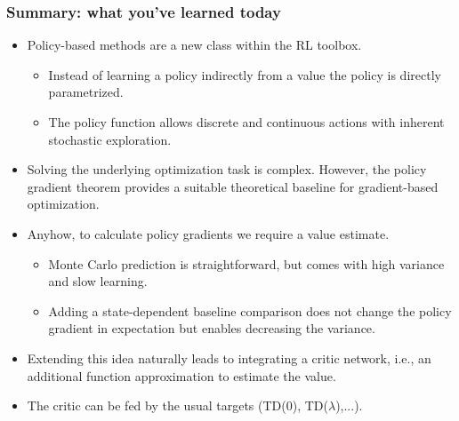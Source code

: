 \begin{frame}
	\frametitle{Summary: what you've learned today}
	\begin{itemize}
		\item Policy-based methods are a new class within the RL toolbox.
		      \begin{itemize}
			      \item Instead of learning a policy indirectly from a value the policy is directly parametrized.\pause
			      \item The policy function allows discrete and continuous actions with inherent stochastic exploration.\pause
		      \end{itemize}
		\item Solving the underlying optimization task is complex. However, the policy gradient theorem provides a suitable theoretical baseline for gradient-based optimization.\pause
		\item Anyhow, to calculate policy gradients we require a value estimate.
		      \begin{itemize}
			      \item Monte Carlo prediction is straightforward, but comes with high variance and slow learning.\pause
			      \item Adding a state-dependent baseline comparison does not change the policy gradient in expectation but enables decreasing the variance.\pause
		      \end{itemize}
		\item Extending this idea naturally leads to integrating a critic network, i.e., an additional function approximation to estimate the value.\pause
		\item The critic can be fed by the usual targets (TD(0), TD($\lambda$),...).
	\end{itemize}
\end{frame}